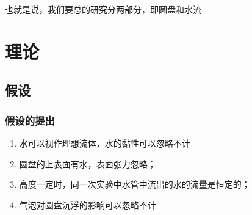 \documentclass[UTF8]{gapd}
\begin{document}
也就是说，我们要总的研究分两部分，即圆盘和水流
%

\section{理论}
\label{sec:unsinkable_disc_theory}
\subsection{假设}
\subsubsection{假设的提出}
\begin{enumerate}
    \item 水可以视作理想流体，水的黏性可以忽略不计
    \item 圆盘的上表面有水，表面张力忽略； 
    \item 高度一定时，同一次实验中水管中流出的水的流量是恒定的；
    \item 气泡对圆盘沉浮的影响可以忽略不计
\end{enumerate}
\end{document}
